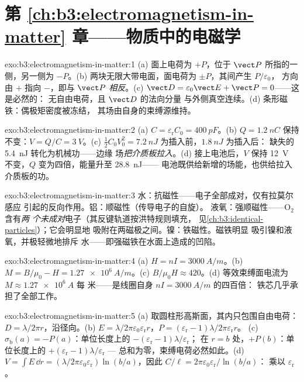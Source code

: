 \section*{第 \ref{ch:b3:electromagnetism-in-matter} 章——物质中的电磁学}

\begin{solution}{exo:b3:electromagnetism-in-matter:1}
(a) 面上电荷为 $+P$，位于 $\vect P$ 所指的一侧，另一侧为 $-P$。(b)
两块无限大带电面，面电荷为 $\pm P$，其间产生 $P/\varepsilon_0$，
方向由 $+$ 指向 $-$，即与 $\vect P$ \emph{相反}。(c)
$\vect D = \varepsilon_0\vect E + \vect P = 0$——这是必然的：
无自由电荷，且 $\vect D$ 的法向分量
与外侧真空连续。(d) 条形磁铁：偶极矩密度被冻结，
其场由自身的束缚源维持。
\end{solution}

\begin{solution}{exo:b3:electromagnetism-in-matter:2}
(a) $C = \varepsilon_{\text{r}}C_0 = \qty{400}{pF}$。(b) $Q =
\qty{1.2}{nC}$ 保持不变：$V = Q/C = \qty{3}{V}$。(c)
$\tfrac12C_0V_0^2 = \qty{7.2}{nJ}$ 为插入前，$\qty{1.8}{nJ}$ 为插入后：
缺失的 \qty{5.4}{nJ} 转化为机械功——边缘
场\emph{把介质板拉入}。(d) 接上电池后，$V$ 保持
\qty{12}{V} 不变，$Q$ 变为四倍，能量升至 \qty{28.8}{nJ}——
电池既供给新增的场能，也供给拉入介质板的功。
\end{solution}

\begin{solution}{exo:b3:electromagnetism-in-matter:3}
水：抗磁性——电子全部成对，仅有拉莫尔感应
引起的反向作用。铝：顺磁性（传导电子的自旋）。
液氧：强顺磁性——O$_2$ 含有\emph{两
个未成对}电子（其反键轨道按洪特规则填充，
见\cref{ch:b3:identical-particles}）；它会明显地
吸附在两磁极之间。镍：铁磁性。磁铁明显
吸引镍和液氧，并极轻微地排斥
水——即强磁铁在水面上造成的凹陷。
\end{solution}

\begin{solution}{exo:b3:electromagnetism-in-matter:4}
(a) $H = nI = \qty{3000}{A/m}$。(b) $M = B/\mu_0 - H =
\qty{1.27e6}{A/m}$。(c) $B/\mu_0H \approx 420$。(d)
等效束缚面电流为 $M \approx \qty{1.27e6}{A}$ 每
米——是线圈自身 $nI = \qty{3000}{A/m}$ 的四百倍：
铁芯几乎承担了全部工作。
\end{solution}

\begin{solution}{exo:b3:electromagnetism-in-matter:5}
(a) 取圆柱形高斯面，其内只包围自由电荷：
$D = \lambda/2\pi r$，沿径向。(b) $E =
\lambda/2\pi\varepsilon_0\varepsilon_{\text{r}}r$，$P =
(\varepsilon_{\text{r}}-1)\lambda/2\pi\varepsilon_{\text{r}}r$。
(c) $\sigma_{\text{b}}(a) = -P(a)$：单位长度上的
$-(\varepsilon_{\text{r}}-1)\lambda/\varepsilon_{\text{r}}$；
在 $r = b$ 处，$+P(b)$：单位长度上的
$+(\varepsilon_{\text{r}}-1)\lambda/\varepsilon_{\text{r}}$ ---
总和为零，束缚电荷必然如此。(d) $V = \int E\,\dd r =
(\lambda/2\pi\varepsilon_0\varepsilon_{\text{r}})\ln(b/a)$，因此
$C/\ell = 2\pi\varepsilon_0\varepsilon_{\text{r}}/\ln(b/a)$：
乘以 $\varepsilon_{\text{r}}$。
\end{solution}

